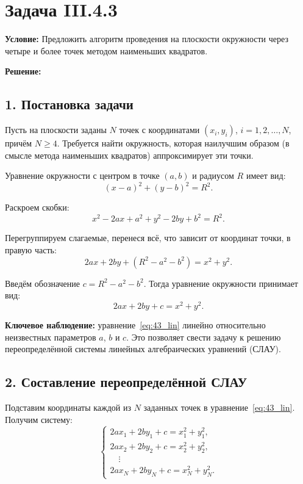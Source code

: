 \documentclass{article}
\begin{document}
\section*{Задача III.4.3}

\textbf{Условие:} Предложить алгоритм проведения на плоскости окружности через четыре и более точек методом наименьших квадратов.

\vspace{0.5cm}
\textbf{Решение:}

\subsection*{1. Постановка задачи}

Пусть на плоскости заданы $N$ точек с координатами $(x_i, y_i)$, $i = 1, 2, \ldots, N$, причём $N \geqslant 4$. Требуется найти окружность, которая наилучшим образом (в смысле метода наименьших квадратов) аппроксимирует эти точки.

Уравнение окружности с центром в точке $(a, b)$ и радиусом $R$ имеет вид:
\begin{equation}
(x - a)^2 + (y - b)^2 = R^2.
\end{equation}

Раскроем скобки:
\begin{equation}
x^2 - 2ax + a^2 + y^2 - 2by + b^2 = R^2.
\end{equation}

Перегруппируем слагаемые, перенеся всё, что зависит от координат точки, в правую часть:
\begin{equation}
2ax + 2by + (R^2 - a^2 - b^2) = x^2 + y^2.
\end{equation}

Введём обозначение $c = R^2 - a^2 - b^2$. Тогда уравнение окружности принимает вид:
\begin{equation}
2ax + 2by + c = x^2 + y^2.
\label{eq:43_lin}
\end{equation}

\textbf{Ключевое наблюдение:} уравнение~\eqref{eq:43_lin} линейно относительно неизвестных параметров $a$, $b$ и $c$. Это позволяет свести задачу к решению переопределённой системы линейных алгебраических уравнений (СЛАУ).

\subsection*{2. Составление переопределённой СЛАУ}

Подставим координаты каждой из $N$ заданных точек в уравнение~\eqref{eq:43_lin}. Получим систему:
\begin{equation}
\begin{cases}
2a x_1 + 2b y_1 + c = x_1^2 + y_1^2, \\
2a x_2 + 2b y_2 + c = x_2^2 + y_2^2, \\
\quad \vdots \\
2a x_N + 2b y_N + c = x_N^2 + y_N^2.
\end{cases}
\end{equation}
\end{document}
